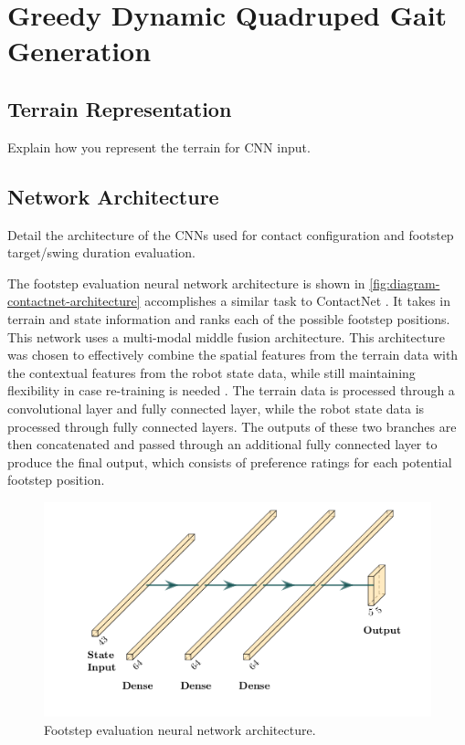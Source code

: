 \section{Greedy Dynamic Quadruped Gait Generation}

\subsection{Terrain Representation}

\begin{outline}
  Explain how you represent the terrain for CNN input.
\end{outline}

\subsection{Network Architecture}

\begin{outline}
  Detail the architecture of the CNNs used for contact configuration
  and footstep target/swing duration evaluation.
\end{outline}

The footstep evaluation neural network architecture is shown in
\autoref{fig:diagram-contactnet-architecture} accomplishes a similar
task to ContactNet \cite{bratta_contactnet_2024}. It takes in terrain
and state information and ranks each of the possible footstep
positions. This network uses a multi-modal middle fusion
architecture. This architecture was chosen to effectively combine the
spatial features from the terrain data with the contextual features
from the robot state data, while still maintaining flexibility in
case re-training is needed \cite{feng2021deep}. The terrain data is
processed through a convolutional layer and fully connected layer,
while the robot state data is processed through fully connected
layers. The outputs of these two branches are then concatenated and
passed through an additional fully connected layer to produce the
final output, which consists of preference ratings for each potential
footstep position.

\begin{figure}
  \centering
  \includegraphics[width=0.5\linewidth]{images/diagrams/contact-network-architecture.png}
  \caption{Footstep evaluation neural network architecture.}
  \label{fig:diagram-contactnet-architecture}
\end{figure}


